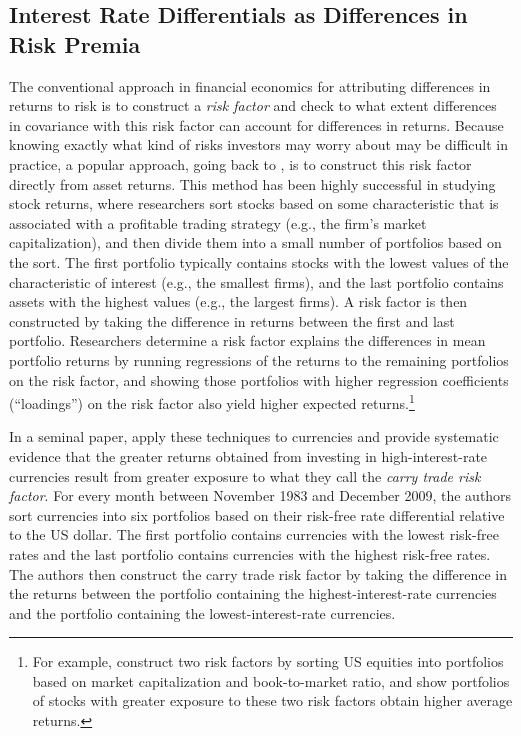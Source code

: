 \documentclass[11pt]{article}
\begin{document}
\subsection{Interest Rate Differentials as Differences in Risk Premia \label{sec_RP}}

The conventional approach in financial economics for attributing differences in returns to risk is to construct a \textit{risk factor} and check to what extent differences in covariance with this risk factor can account for differences in returns. Because knowing exactly what kind of risks investors may worry about may be difficult in practice, a popular approach, going back to \cite{Fama1976}, is to construct this risk factor directly from asset returns. This method has been highly successful in studying stock returns, where researchers sort stocks based on some characteristic that is associated with a profitable trading strategy (e.g., the firm's market capitalization), and then divide them into a small number of portfolios based on the sort. The first portfolio typically contains stocks with the lowest values of the characteristic of interest (e.g., the smallest firms), and the last portfolio contains assets with the highest values (e.g., the largest firms). A risk factor is then constructed by taking the difference in returns between the first and last portfolio. Researchers determine a risk factor explains the differences in mean portfolio returns by running regressions of the returns to the remaining portfolios on the risk factor, and showing those portfolios with higher regression coefficients (``loadings'') on the risk factor also yield higher expected returns.\footnote{For example, \citet{FamaFrench1992} construct two risk factors by sorting US equities into portfolios based on market capitalization and book-to-market ratio, and show portfolios of stocks with greater exposure to these two risk factors obtain higher average returns.}

In a seminal paper, \citet{LustigRoussanovVerdelhan2011} apply these techniques to currencies and provide systematic evidence that the greater returns obtained from investing in high-interest-rate currencies result from greater exposure to what they call the \emph{carry trade risk factor}. For every month between November 1983 and December 2009, the authors sort currencies into six portfolios based on their risk-free rate differential relative to the US dollar. The first portfolio contains currencies with the lowest risk-free rates and the last portfolio contains currencies with the highest risk-free rates. The authors then construct the carry trade risk factor by taking the difference in the returns between the portfolio containing the highest-interest-rate currencies and the portfolio containing the lowest-interest-rate currencies.
\end{document}
